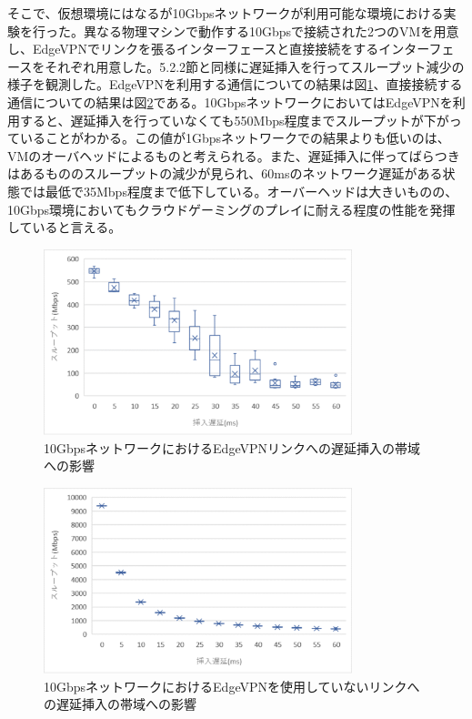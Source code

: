 そこで、仮想環境にはなるが10Gbpsネットワークが利用可能な環境における実験を行った。異なる物理マシンで動作する10Gbpsで接続された2つのVMを用意し、EdgeVPNでリンクを張るインターフェースと直接接続をするインターフェースをそれぞれ用意した。5.2.2節と同様に遅延挿入を行ってスループット減少の様子を観測した。EdgeVPNを利用する通信についての結果は図\ref{fig:band_withedge_vm}、直接接続する通信についての結果は図\ref{fig:band_withoutedge_vm}である。10GbpsネットワークにおいてはEdgeVPNを利用すると、遅延挿入を行っていなくても550Mbps程度までスループットが下がっていることがわかる。この値が1Gbpsネットワークでの結果よりも低いのは、VMのオーバヘッドによるものと考えられる。また、遅延挿入に伴ってばらつきはあるもののスループットの減少が見られ、60msのネットワーク遅延がある状態では最低で35Mbps程度まで低下している。オーバーヘッドは大きいものの、10Gbps環境においてもクラウドゲーミングのプレイに耐える程度の性能を発揮していると言える。


\begin{figure}[t]
    \centering
    \includegraphics[width=0.8\textwidth,keepaspectratio,clip]{img/band_withedge_vm.eps}
    \caption{10GbpsネットワークにおけるEdgeVPNリンクへの遅延挿入の帯域への影響}
    \label{fig:band_withedge_vm}
\end{figure}

\begin{figure}[t]
    \centering
    \includegraphics[width=0.8\textwidth,keepaspectratio,clip]{img/band_withoutedge_vm.eps}
    \caption{10GbpsネットワークにおけるEdgeVPNを使用していないリンクへの遅延挿入の帯域への影響}
    \label{fig:band_withoutedge_vm}
\end{figure}

